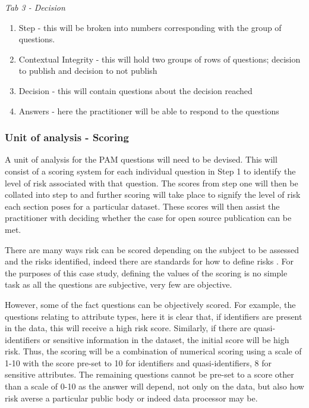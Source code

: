 {\it Tab 3 - Decision}
\begin{enumerate}
\item Step - this will be broken into numbers corresponding with the group of questions. 
\item Contextual Integrity - this will hold two groups of rows of questions; decision to publish and decision to not publish
\item Decision - this will contain questions about the decision reached 
\item Answers - here the practitioner will be able to respond to the questions
\end {enumerate}

\subsubsection {Unit of analysis - Scoring}

A unit of analysis for the PAM questions will need to be devised. This will consist of a scoring system for each individual question in Step 1 to identify the level of risk associated with that question. The scores from step one will  then be collated into step to and further scoring will take place to signify the level of risk each section poses for a particular dataset. These scores will then assist the practitioner with deciding whether the case for open source publication can be met. 

There are many ways risk can be scored depending on the subject to be assessed and the risks identified, indeed there are standards for how to define risks \cite{Risk_Management2015}. For the purposes of this case study, defining the values of the scoring is no simple task as all the questions are subjective, very few are objective. 

However, some of the fact questions can be objectively scored. For example, the questions relating to attribute types, here it is clear that, if identifiers are present in the data, this will receive a high risk score. Similarly, if there are quasi-identifiers or sensitive information in the dataset, the initial score will be high risk. Thus, the scoring will be a combination of numerical scoring using a scale of 1-10  with the score pre-set to 10 for identifiers and quasi-identifiers, 8 for sensitive attributes. The remaining questions cannot be pre-set to a score other than a scale of 0-10 as the answer will depend, not only on the data, but also how risk averse a particular public body or indeed data processor may be.

